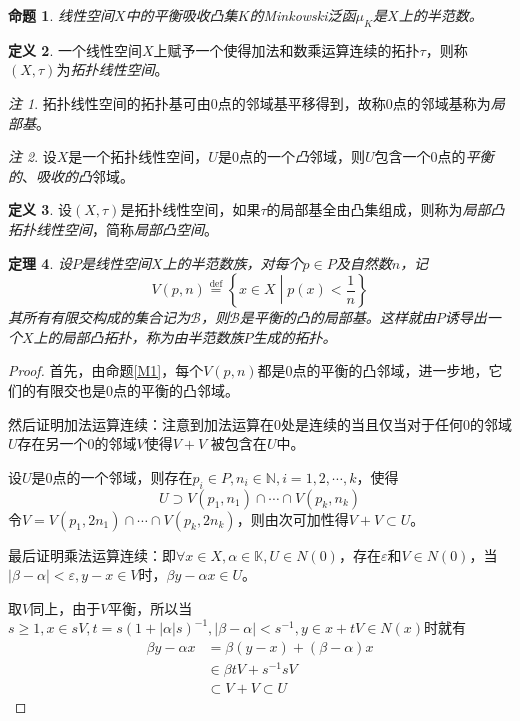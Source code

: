 \documentclass[winfonts,UTF8,c5size,a4paper,fancyhdr,hyperref,titlepage,nocap]{ctexart}
\theoremstyle{question}
\theoremstyle{theorem}
\newtheorem{thm}{定理}
\newtheorem{prop}[thm]{命题}
\theoremstyle{definition}
\newtheorem{defn}[thm]{定义}
\theoremstyle{remark}
\newtheorem*{rem}{注}
\numberwithin{equation}{subsection}
\newcommand{\N}{\mathbb{N}}
\newcommand{\K}{\mathbb{K}}
\newcommand{\red}{\color{red}}
\newcommand{\defeq}{\stackrel{{\mathrm{def}}}{=}}
\begin{document}
\begin{prop}
  线性空间$X$中的平衡吸收凸集$K$的Minkowski泛函$\mu_K$是$X$上的半范数。
\end{prop}

\begin{defn}
  一个线性空间$X$上赋予一个使得加法和数乘运算连续的拓扑$\tau$，则称$(X,\tau)$为\emph{\red 拓扑线性空间}。
\end{defn}
\begin{rem}
拓扑线性空间的拓扑基可由$0$点的邻域基平移得到，故称$0$点的邻域基称为\emph{\red 局部基}。
\end{rem}

\begin{rem}
设$X$是一个拓扑线性空间，$U$是$0$点的一个\emph{凸}邻域，则$U$包含一个$0$点的\emph{平衡的}、\emph{吸收的}\emph{凸}邻域。
\end{rem}

\begin{defn}
  设$(X,\tau)$是拓扑线性空间，如果$\tau$的局部基全由凸集组成，则称为\emph{\red 局部凸拓扑线性空间}，简称\emph{\red 局部凸空间}。
\end{defn}

\begin{thm}
  设$P$是线性空间$X$上的半范数族，对每个$p\in P$及自然数$n$，记
\begin{equation*}
V(p,n)\defeq\left\{x\in X\middle|p(x)<\frac{1}{n}\right\}
\end{equation*}
其所有有限交构成的集合记为$\mathscr{B}$，则$\mathscr{B}$是平衡的凸的局部基。这样就由$P$诱导出一个$X$上的局部凸拓扑，称为由半范数族$P${\red 生成}的拓扑。
\end{thm}
\begin{proof}
  首先，由命题\ref{M1}，每个$V(p,n)$都是$0$点的平衡的凸邻域，进一步地，它们的有限交也是$0$点的平衡的凸邻域。

  然后证明加法运算连续：注意到加法运算在$0$处是连续的当且仅当对于任何$0$的邻域$U$存在另一个$0$的邻域$V$使得$V + V$ 被包含在$U$中。

  设$U$是$0$点的一个邻域，则存在$p_i\in P,n_i\in\N,i=1,2,\cdots,k$，使得
  \begin{equation*}
  U\supset V(p_1,n_1)\cap\cdots\cap V(p_k,n_k)
  \end{equation*}
  令$V=V(p_1,2n_1)\cap\cdots\cap V(p_k,2n_k)$，则由次可加性得$V+V\subset U$。

  最后证明乘法运算连续：即$\forall x\in X,\alpha\in\K, U\in N(0)$，存在$\varepsilon$和$V\in N(0)$，当$|\beta-\alpha|<\varepsilon,y-x\in V$时，$\beta y-\alpha x\in U$。

  取$V$同上，由于$V$平衡，所以当$s\geqslant1,x\in sV, t=s(1+|\alpha|s)^{-1},|\beta-\alpha|<s^{-1},y\in x+tV\in N(x)$时就有
  \begin{align*}
    \beta y-\alpha x &=\beta(y-x)+(\beta-\alpha)x \\
                             &\in\beta tV+s^{-1}sV\\
                             &\subset V+V\subset U
  \end{align*}
\end{proof}
\end{document}
